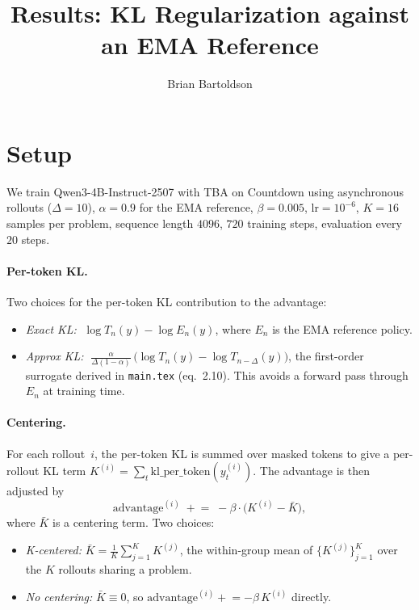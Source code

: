 \documentclass[11pt]{amsart}
\title{Results: KL Regularization against an EMA Reference}
\author{Brian Bartoldson}
\date{}
\newcommand{\Tn}{T_n}
\newcommand{\En}{E_n}
\newcommand{\Tinf}{T_{n-\Delta}}
\newcommand{\klexact}{\log \Tn(y) - \log \En(y)}
\newcommand{\klapprox}{\tfrac{\alpha}{\Delta(1-\alpha)}\,\bigl(\log \Tn(y) - \log \Tinf(y)\bigr)}
\begin{document}
\maketitle

\section{Setup}

We train Qwen3-4B-Instruct-2507 with TBA on Countdown using asynchronous rollouts ($\Delta = 10$), $\alpha=0.9$ for the EMA reference, $\beta=0.005$, $\text{lr}=10^{-6}$, $K=16$ samples per problem, sequence length $4096$, $720$ training steps, evaluation every $20$ steps.

\paragraph{Per-token KL.}
Two choices for the per-token KL contribution to the advantage:
\begin{itemize}
    \item \emph{Exact KL:} $\;\klexact$, where $\En$ is the EMA reference policy.
    \item \emph{Approx KL:} $\;\klapprox$, the first-order surrogate derived in \texttt{main.tex} (eq.~2.10). This avoids a forward pass through $\En$ at training time.
\end{itemize}

\paragraph{Centering.}
For each rollout~$i$, the per-token KL is summed over masked tokens to give a per-rollout KL term $K^{(i)} = \sum_t \mathrm{kl\_per\_token}(y^{(i)}_t)$. The advantage is then adjusted by
\begin{equation}\label{eq:adv-update}
    \text{advantage}^{(i)} \;\mathrel{+}{=}\; -\beta \cdot \bigl(K^{(i)} - \bar{K}\bigr),
\end{equation}
where $\bar{K}$ is a centering term. Two choices:
\begin{itemize}
    \item \emph{K-centered:} $\bar{K} = \frac{1}{K}\sum_{j=1}^K K^{(j)}$, the within-group mean of $\{K^{(j)}\}_{j=1}^K$ over the $K$ rollouts sharing a problem.
    \item \emph{No centering:} $\bar{K} \equiv 0$, so $\text{advantage}^{(i)} \mathrel{+}{=} -\beta\,K^{(i)}$ directly.
\end{itemize}
\end{document}
